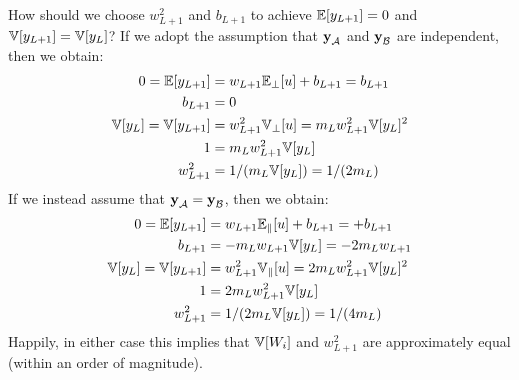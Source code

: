 How should we choose $w_{L+1}^2$ and $b_{L+1}$ to achieve $\mathbb{E}[y_{L+1}] = 0$ and $\mathbb{V}[y_{L+1}] = \mathbb{V}[y_{L}]$?
If we adopt the assumption that $\boldsymbol{\mathbf{y}}_{\mathcal{A}}$ and $\boldsymbol{\mathbf{y}}_{\mathcal{B}}$ are independent, then we obtain:
\begin{align}
0 = \mathbb{E}[y_{L+1}] & = w_{L+1} \mathbb{E}_{\bot}[u] + b_{L+1} = b_{L+1} \\
b_{L+1} & = 0 \\
\mathbb{V}[y_{L}] = \mathbb{V}[y_{L+1}] & = w_{L+1}^2 \mathbb{V}_{\bot}[u] = m_{L} w_{L+1}^2 \mathbb{V}[y_{L}]^2 \\
1 & = m_{L} w_{L+1}^2 \mathbb{V}[y_{L}] \\
w_{L+1}^2 & = 1 / (m_{L} \mathbb{V}[y_{L}]) = 1 / (2 m_{L})
\end{align}
If we instead assume that $\boldsymbol{\mathbf{y}}_{\mathcal{A}} = \boldsymbol{\mathbf{y}}_{\mathcal{B}}$, then we obtain:
\begin{align}
0 = \mathbb{E}[y_{L+1}] & = w_{L+1} \mathbb{E}_{\parallel}[u] + b_{L+1} =  + b_{L+1} \\
b_{L+1} & = -m_{L} w_{L+1} \mathbb{V}[y_{L}] = -2 m_{L} w_{L+1} \\
\mathbb{V}[y_{L}] = \mathbb{V}[y_{L+1}] & = w_{L+1}^2 \mathbb{V}_{\parallel}[u] = 2 m_{L} w_{L+1}^2 \mathbb{V}[y_{L}]^2 \\
1 & = 2 m_{L} w_{L+1}^2 \mathbb{V}[y_{L}] \\
w_{L+1}^2 & = 1 / (2 m_{L} \mathbb{V}[y_{L}]) = 1 / (4 m_{L})
\end{align}
Happily, in either case this implies that $\mathbb{V}[W_{i}]$ and $w_{L+1}^2$ are approximately equal (within an order of magnitude).




